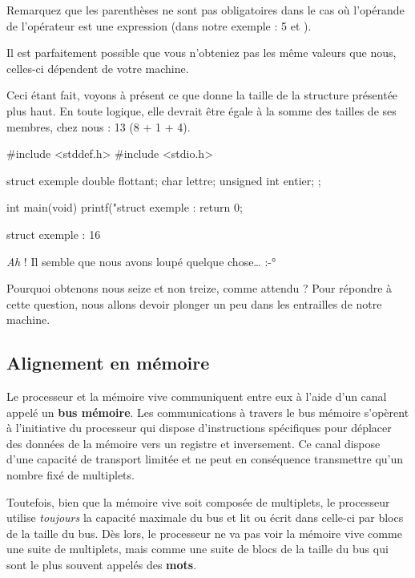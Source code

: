 Remarquez que les parenthèses ne sont pas obligatoires dans le cas où
l'opérande de l'opérateur  est une expression (dans notre
exemple : 5 et ).

\begin{infobox}
 Il est parfaitement possible que vous n'obteniez pas les même valeurs que nous,
celles-ci dépendent de votre machine.
\end{infobox}


Ceci étant fait, voyons à présent ce que donne la taille de la structure
présentée plus haut. En toute logique, elle devrait être égale à la
somme des tailles de ses membres, chez nous : 13 (8 + 1 + 4).

\begin{C}
#include <stddef.h>
#include <stdio.h>

struct exemple
{
    double flottant;
    char lettre;
    unsigned int entier;
};


int main(void)
{
    printf("struct exemple : %
    return 0;
}
\end{C}

\begin{C}
struct exemple : 16
\end{C}

\emph{Ah} ! Il semble que nous avons loupé quelque chose\ldots{} :-°

Pourquoi obtenons nous seize et non treize, comme attendu ? Pour
répondre à cette question, nous allons devoir plonger un peu dans les
entrailles de notre machine.

\subsection{Alignement en mémoire}
\label{alignement-en-memoire}

Le processeur et la mémoire vive communiquent entre eux à l'aide d'un
canal appelé un \textbf{bus mémoire}. Les communications à travers le
bus mémoire s'opèrent à l'initiative du processeur qui dispose
d'instructions spécifiques pour déplacer des données de la mémoire vers
un registre et inversement. Ce canal dispose d'une capacité de transport
limitée et ne peut en conséquence transmettre qu'un nombre fixé de
multiplets.

Toutefois, bien que la mémoire vive soit composée de multiplets, le
processeur utilise \emph{toujours} la capacité maximale du bus et lit ou
écrit dans celle-ci par blocs de la taille du bus. Dès lors, le
processeur ne va pas voir la mémoire vive comme une suite de multiplets,
mais comme une suite de blocs de la taille du bus qui sont le plus
souvent appelés des \textbf{mots}.

